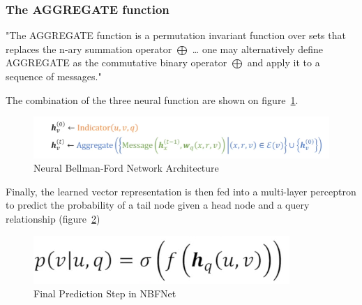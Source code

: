 \subsubsection{The AGGREGATE function}
"The AGGREGATE function is a permutation invariant function
over sets that replaces the n-ary summation operator $\bigoplus$ \ldots
one may alternatively define AGGREGATE as the commutative binary operator $\bigoplus$ and apply it
to a sequence of messages." ~\cite{NBFNet}


The combination of the three neural function are shown on figure~\ref{fig:neural-bf}.

\begin{figure}[h] %
    \centering %
    \includegraphics[width=0.65\linewidth]{figures/nbfnet-architecture} %
    \caption{Neural Bellman-Ford Network Architecture ~\cite{NBfnetPres}} %
    \label{fig:neural-bf} %
\end{figure}


Finally, the learned vector representation is then fed into a multi-layer perceptron to predict the probability
of a tail node given a head node and a query relationship (figure~\ref{fig:nbfnet-mlp})

\begin{figure}[h] %
    \centering %
    \includegraphics[width=0.4\linewidth]{figures/nbfnet-mlp} %
    \caption{Final Prediction Step in NBFNet ~\cite{NBfnetPres}} %
    \label{fig:nbfnet-mlp} %
\end{figure}

